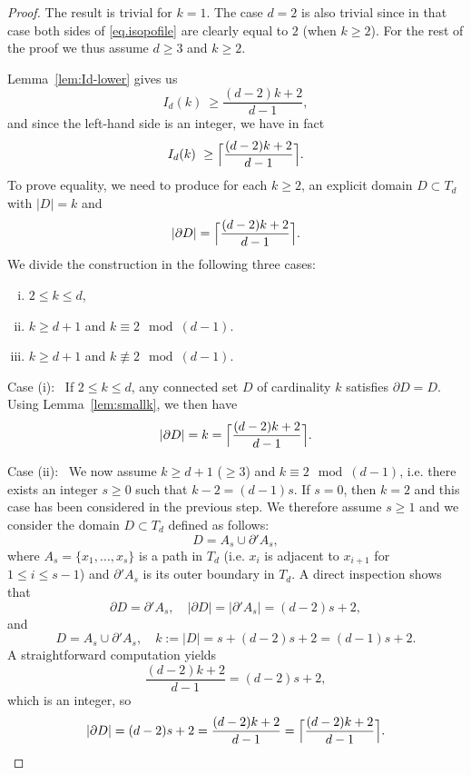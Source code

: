 \documentclass[a4paper, 11pt]{article}
\numberwithin{equation}{section}
\theoremstyle{definition}
\theoremstyle{remark}
\begin{document}
\begin{proof} 
The result is trivial for  $k=1$. The case $d = 2$ is also trivial since in that case both sides of  \eqref{eq.isopofile} are clearly equal to $2$ (when $k \geq 2$). For the rest of the proof we thus assume $d\geq 3$ and $k\ge 2$. 

\medskip 

 Lemma~\ref{lem:Id-lower} gives us 
\[
   I_d(k) \  \geq  \frac{(d-2)k+2}{d-1},
\]
and since the left-hand side is an integer, we have in fact
\[
   I_d(k) \  \geq  \Bigl\lceil \frac{(d-2)k+2}{d-1}\Bigr\rceil.
\]
To prove equality, we need to produce for each $k\ge 2$, an explicit domain $D\subset T_d$ with $|D|=k$ and
\begin{equation}\label{domoptimal1}
    |\partial D| = \Bigl\lceil \frac{(d-2)k+2}{d-1}\Bigr\rceil.
\end{equation}
We divide the construction  in the following three cases:
\begin{enumerate}[(i)]
\item $2\le k\le d$,
\item $k\geq d+1$ and  $k \equiv 2  \mod (d-1)$.
\item $k\geq d+1$ and  $k \not\equiv 2  \mod (d-1)$.
\end{enumerate}

Case (i): \  If $2\le k\le d$, any connected set $D$ of cardinality $k$ satisfies
$\partial D = D$.  Using  Lemma~\ref{lem:smallk}, we then have 
$$|\partial D| = k = \Bigl\lceil \frac{(d-2)k+2}{d-1}\Bigr\rceil.$$

\medskip 

Case (ii): \  We now assume  $k\geq d+1$ ($\geq 3$) and  $k \equiv 2  \mod (d-1)$, i.e. there exists an integer $s\geq 0$ such that $k-2 = (d-1)s$.
If  $s=0$, then $k=2$ and this case has been considered in the previous step. We therefore assume $s\geq 1$
and we consider the  domain $D\subset T_d$ defined as follows: 
$$
  D = A_s \cup \partial'A_s,
$$
where  $A_s = \{x_1,\dots,x_s\}$ is a path in $T_d$ (i.e. $x_i$ is adjacent to $x_{i+1}$ for $1\leq i \leq s-1$)  and $\partial'A_s$ is its outer boundary in $T_d$. A direct inspection shows that
$$
 \partial D = \partial'A_s, \quad   |\partial D| = |\partial'A_s| =  (d-2)s + 2,
$$
and
$$
  D =  A_s \cup \partial'A_s, \quad  k :=  |D| = s + (d-2)s + 2 = (d-1)s + 2.
$$
A   straightforward computation yields
$$
   \frac{(d-2)k+2}{d-1} = (d-2)s + 2,
$$
which is an integer, so
$$
   |\partial D| = (d-2)s + 2  = \frac{(d-2)k+2}{d-1}  = \Bigl\lceil \frac{(d-2)k+2}{d-1}\Bigr\rceil.
$$


\end{proof}
\end{document}
